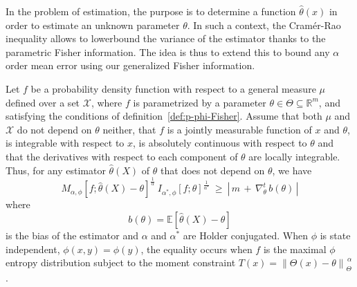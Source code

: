 \documentclass[entropy,article,submit,moreauthors,pdftex]{Definitions/mdpi}
\newcommand{\SZ}[1]{{\color{blue} #1}}
\def\Rset{\mathbb{R}}
\def\X{\mathcal{X}}
\newcommand{\Esp}[1]{\mathbb{E}\left[ #1 \right]}
\begin{document}
In  the  problem  of  estimation,  the   purpose  is  to  determine  a  function
$\hat{\theta}(x)$ in order to estimate an  unknown parameter $\theta$. In such a
context, the  Cram\'er-Rao inequality allows  to lowerbound the variance  of the
estimator thanks  to the  parametric Fisher  information.  The  idea is  thus to
extend this to bound any $\alpha$  order mean error using our generalized Fisher
information.
%
\begin{Proposition}
\label{prop:p-phi-CR}
  Let $f$  be a probability density  function with respect to  a general measure
  $\mu$ defined  over a set $\X$,  \SZ{where $f$ is parametrized  by a parameter
    $\theta \in  \Theta \subseteq  \Rset^m$}, and  satisfying the  conditions of
  definition~\ref{def:p-phi-Fisher}.   Assume that  both $\mu$  and $\X$  do not
  depend on $\theta$  neither, that $f$ is a jointly  measurable function of $x$
  and $\theta$, is integrable with respect to $x$, is absolutely continuous with
  respect to $\theta$ and that the derivatives with respect to each component of
  $\theta$    are    locally    integrable.     Thus,    for    any    estimator
  $\widehat{\theta}(X)$ of $\theta$ that does not depend on $\theta$, we have
  \begin{equation}\label{eq:phi-CR}
  M_{\alpha,\phi} \! \left[ f ; \widehat{\theta}(X) - \theta
    \right]^{\frac{1}{\alpha}} \:
  I_{\alpha^*\!,\phi}[f;\theta]^{\frac{1}{\alpha^*}} \: \ge \: \left| \, m \, +
  \, \nabla_\theta^t \, b(\theta) \, \right|
  \end{equation}
  where
  \begin{equation}
  b(\theta) = \Esp{\widehat{\theta}(X) - \theta}
  \end{equation}
  is  the  bias  of  the  estimator  and  $\alpha$  and  $\alpha^*$  are  Holder
  conjugated.   When $\phi$  is state  independent, $\phi(x,y)  = \phi(y)$,  the
  equality occurs when $f$ is the maximal $\phi$ entropy distribution subject to
  the moment constraint $T(x) = \left\| \Theta(x) - \theta \right\|_{\Theta}^{\,
    \alpha}$.
\end{Proposition}
%
\end{document}
